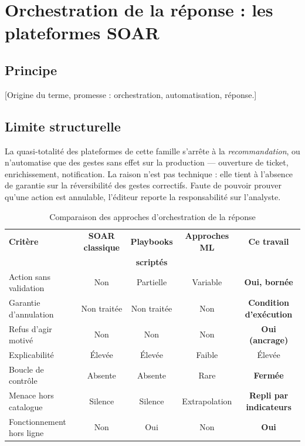 \section{Orchestration de la r\'eponse : les plateformes SOAR}
\subsection{Principe}
[Origine du terme, promesse : orchestration, automatisation, r\'eponse.]

\subsection{Limite structurelle}
La quasi-totalit\'e des plateformes de cette famille s'arr\^ete \`a la
\emph{recommandation}, ou n'automatise que des gestes sans effet sur la
production --- ouverture de ticket, enrichissement, notification. La raison n'est
pas technique : elle tient \`a l'absence de garantie sur la r\'eversibilit\'e des gestes
correctifs. Faute de pouvoir prouver qu'une action est annulable, l'\'editeur
reporte la responsabilit\'e sur l'analyste.

\begin{table}[H]
\centering
\caption{Comparaison des approches d'orchestration de la r\'eponse}
\label{tab:comparaison-soar}
\small
\begin{tabular}{@{}lcccc@{}}
\toprule
\textbf{Crit\`ere} & \textbf{SOAR classique} & \textbf{Playbooks} & \textbf{Approches ML} & \textbf{Ce travail} \\
 & & \textbf{scriptés} & & \\
\midrule
Action sans validation   & Non           & Partielle    & Variable & \textbf{Oui, born\'ee} \\
Garantie d'annulation    & Non trait\'ee  & Non trait\'ee & Non      & \textbf{Condition d'ex\'ecution} \\
Refus d'agir motiv\'e     & Non           & Non          & Non      & \textbf{Oui (ancrage)} \\
Explicabilit\'e           & \'Elev\'ee     & \'Elev\'ee    & Faible   & \'Elev\'ee \\
Boucle de contr\^ole      & Absente       & Absente      & Rare     & \textbf{Ferm\'ee} \\
Menace hors catalogue    & Silence       & Silence      & Extrapolation & \textbf{Repli par indicateurs} \\
Fonctionnement hors ligne& Non           & Oui          & Non      & \textbf{Oui} \\
\bottomrule
\end{tabular}
\end{table}

